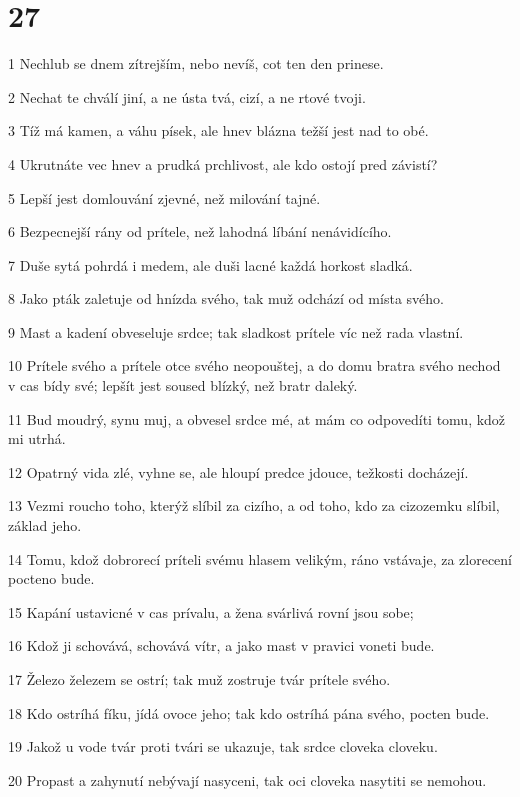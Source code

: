 \chapter{27}

\par 1 Nechlub se dnem zítrejším, nebo nevíš, cot ten den prinese.
\par 2 Nechat te chválí jiní, a ne ústa tvá, cizí, a ne rtové tvoji.
\par 3 Tíž má kamen, a váhu písek, ale hnev blázna težší jest nad to obé.
\par 4 Ukrutnáte vec hnev a prudká prchlivost, ale kdo ostojí pred závistí?
\par 5 Lepší jest domlouvání zjevné, než milování tajné.
\par 6 Bezpecnejší rány od prítele, než lahodná líbání nenávidícího.
\par 7 Duše sytá pohrdá i medem, ale duši lacné každá horkost sladká.
\par 8 Jako pták zaletuje od hnízda svého, tak muž odchází od místa svého.
\par 9 Mast a kadení obveseluje srdce; tak sladkost prítele víc než rada vlastní.
\par 10 Prítele svého a prítele otce svého neopouštej, a do domu bratra svého nechod v cas bídy své; lepšít jest soused blízký, než bratr daleký.
\par 11 Bud moudrý, synu muj, a obvesel srdce mé, at mám co odpovedíti tomu, kdož mi utrhá.
\par 12 Opatrný vida zlé, vyhne se, ale hloupí predce jdouce, težkosti docházejí.
\par 13 Vezmi roucho toho, kterýž slíbil za cizího, a od toho, kdo za cizozemku slíbil, základ jeho.
\par 14 Tomu, kdož dobrorecí príteli svému hlasem velikým, ráno vstávaje, za zlorecení pocteno bude.
\par 15 Kapání ustavicné v cas prívalu, a žena svárlivá rovní jsou sobe;
\par 16 Kdož ji schovává, schovává vítr, a jako mast v pravici voneti bude.
\par 17 Železo železem se ostrí; tak muž zostruje tvár prítele svého.
\par 18 Kdo ostríhá fíku, jídá ovoce jeho; tak kdo ostríhá pána svého, pocten bude.
\par 19 Jakož u vode tvár proti tvári se ukazuje, tak srdce cloveka cloveku.
\par 20 Propast a zahynutí nebývají nasyceni, tak oci cloveka nasytiti se nemohou.
